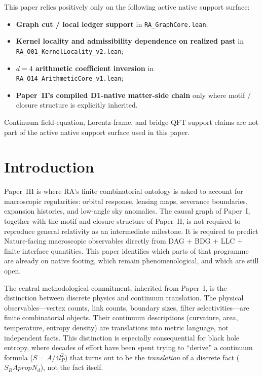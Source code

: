 \documentclass[11pt]{article}
\def\mathrm#1{#1}%
\def\partial{d}%
\def\propto{prop}%
\def\SRa{S_RA}%
\newcommand{\SRa}{S_{\mathrm{RA}}}
\begin{document}
\begin{tcolorbox}[title=Active Native Support in the Current Suite Pass,colback=gray!5,colframe=gray!60]
This paper relies positively only on the following active native support surface:
\begin{itemize}[nosep]
    \item \textbf{Graph cut / local ledger support} in \texttt{RA\_GraphCore.lean};
    \item \textbf{Kernel locality and admissibility dependence on realized past} in \texttt{RA\_O01\_KernelLocality\_v2.lean};
    \item \textbf{$d=4$ arithmetic coefficient inversion} in \texttt{RA\_O14\_ArithmeticCore\_v1.lean};
    \item \textbf{Paper~II's compiled D1-native matter-side chain} only where motif / closure structure is explicitly inherited.
\end{itemize}
Continuum field-equation, Lorentz-frame, and bridge-QFT support claims are not part of the active native support surface used in this paper.
\end{tcolorbox}

\section{Introduction}

Paper~III is where RA's finite combinatorial ontology is asked to account for macroscopic regularities: orbital response, lensing maps, severance boundaries, expansion histories, and low-angle sky anomalies. The causal graph of Paper~I, together with the motif and closure structure of Paper~II, is not required to reproduce general relativity as an intermediate milestone. It is required to predict Nature-facing macroscopic observables directly from DAG + BDG + LLC + finite interface quantities. This paper identifies which parts of that programme are already on native footing, which remain phenomenological, and which are still open.

The central methodological commitment, inherited from Paper~I, is the distinction between discrete physics and continuum translation. The physical observables---vertex counts, link counts, boundary sizes, filter selectivities---are finite combinatorial objects. Their continuum descriptions (curvature, area, temperature, entropy density) are translations into metric language, not independent facts. This distinction is especially consequential for black hole entropy, where decades of effort have been spent trying to ``derive'' a continuum formula ($S=A/4l_P^2$) that turns out to be the \emph{translation} of a discrete fact ($\SRa\propto N_\partial$), not the fact itself.
\end{document}

